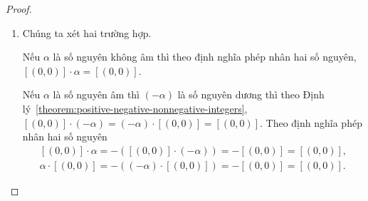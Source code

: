 \begin{proof}
	\begin{enumerate}[label={(\roman*)}]
		\item Chúng ta xét hai trường hợp.

		      Nếu $\alpha$ là số nguyên không âm thì theo định nghĩa phép nhân hai số nguyên, $[(0, 0)]\cdot\alpha = [(0, 0)]$.

		      Nếu $\alpha$ là số nguyên âm thì $(-\alpha)$ là số nguyên dương thì theo Định lý~\ref{theorem:positive-negative-nonnegative-integers}, $[(0, 0)]\cdot (-\alpha) = (-\alpha)\cdot [(0, 0)] = [(0, 0)]$. Theo định nghĩa phép nhân hai số nguyên
		      \[
			      \begin{split}
				      [(0, 0)]\cdot\alpha = -([(0, 0)]\cdot (-\alpha)) = -[(0,0)] = [(0, 0)], \\
				      \alpha\cdot[(0, 0)] = -((-\alpha)\cdot [(0, 0)]) = -[(0,0)] = [(0, 0)].
			      \end{split}
		      \]


\end{enumerate}
\end{proof}
